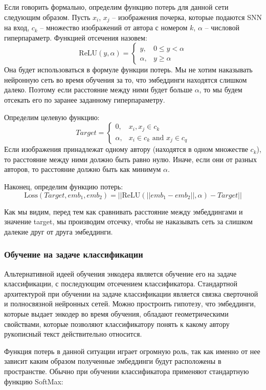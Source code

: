     Если говорить формально, определим функцию потерь для данной сети следующим образом. Пусть
$x_i$, $x_j$ -- изображения почерка, которые подаются SNN на вход, $c_k$ -- множество изображений от автора с номером $k$, $\alpha$ -- числовой гиперпараметр. Функцией отсечения назовем: 
$$
    \text{ReLU}(y, \alpha) = 
\begin{cases}
    y,& 0 \le y < \alpha \\
    \alpha,& y \geq \alpha
\end{cases}
$$
Она будет использоваться в формуле функции потерь. Мы не хотим наказывать нейронную сеть во время обучения за то, что эмбеддинги находятся слишком далеко. Поэтому если расстояние между ними будет больше $\alpha$, то мы будем отсекать его по заранее заданному гиперпараметру. 

\noindent
Определим целевую функцию:
$$
Target =
\begin{cases}
    0,& x_i, x_j \in c_k \\
    \alpha,& x_i \in c_k \text{ and } x_j \in c_q
\end{cases}
$$
Если изображения принадлежат одному автору (находятся в одном множестве $c_k$), то расстояние между ними должно быть равно нулю. Иначе, если они от разных авторов, то расстояние должно быть как минимум $\alpha$. 

\noindent
Наконец, определим функцию потерь:
$$\text{Loss}(Target, emb_1, emb_2) = ||\text{ReLU}(|| emb_1 - emb_2 ||, \alpha) - Target||$$

\noindent
Как мы видим, перед тем как сравнивать расстояние между эмбеддингами и значение target, мы производим отсечку, чтобы не наказывать сеть за слишком далекие друг от друга эмбеддинги.

\subsubsection{Обучение на задаче классификации}

Альтернативной идеей обучения энкодера является обучение его на задаче классификации, с последующим отсечением классификатора. Стандартной архитектурой при обучении на задаче классификации является связка сверточной и полносвязной нейронных сетей. Можно простроить гипотезу, что эмбеддинги, которые выдает энкодер во время обучения, обладают геометрическими свойствами, которые позволяют классификатору понять к какому автору рукописный текст действительно относится.

Функция потерь в данной ситуации играет огромную роль, так как именно от нее зависит каким образом полученные эмбеддинги будут расположены в пространстве. Обычно при обучении классификатора применяют стандартную функцию SoftMax:

